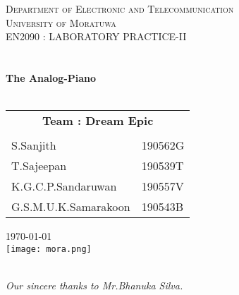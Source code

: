 \documentclass[class=article,crop=false]{standalone}
\begin{document}
\begin{titlepage}

    \center

    \textsc{\Large Department of Electronic and Telecommunication}\\[.4cm]
    \textsc{\Large University of Moratuwa}\\[1cm]

    \textsc{\Large EN2090 : LABORATORY PRACTICE-II}\\[0.2cm]
    \textsc{\large }\\[1cm] 										%
    \HRule \\[0.8cm]
    { \LARGE \bfseries The Analog-Piano}\\[0.7cm]
    \HRule \\[1.5cm]
    \large
    \begin{center}
        \begin{tabular}{l l}
            \multicolumn{2}{c}{\textbf{Team : Dream Epic}} \\\\
            S.Sanjith  & 190562G \\
            T.Sajeepan & 190539T \\
            K.G.C.P.Sandaruwan  & 190557V \\
            G.S.M.U.K.Samarakoon & 190543B \\
        \end{tabular}
    \end{center}
\vspace*{1cm}
    {\Large \today}\\[1cm]
    \texttt{[image: mora.png]}\\[3cm] 	
    \HRule\\
    \begin{flushleft}
        \vspace*{-.2cm}
        \emph{Our sincere thanks to Mr.Bhanuka Silva.}
    \end{flushleft}
    \vfill
\end{titlepage}
\end{document}
